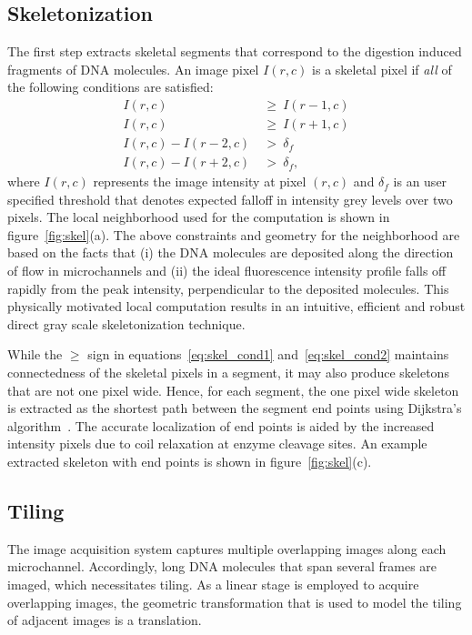 \documentclass{bmcart}
\begin{document}
\subsection*{Skeletonization}
The first step extracts skeletal segments that correspond to the digestion 
induced fragments of DNA molecules. An image pixel $I(r, c)$ is a 
skeletal pixel if \emph{all} of the following conditions are satisfied:
\begin{align}
I(r, c)~&\geq~I(r - 1, c) \label{eq:skel_cond1}\\
I(r, c)~&\geq~I(r + 1, c) \label{eq:skel_cond2}\\
I(r, c) - I(r - 2, c)~&>~\delta_f \label{eq:skel_cond3}\\ 
I(r, c) - I(r + 2, c)~&>~\delta_f \label{eq:skel_cond4},
\end{align}
where $I(r, c)$ represents the image intensity at pixel $(r, c)$ and $\delta_f$ 
is an user specified threshold that denotes expected falloff 
in intensity grey levels over two pixels. The local neighborhood used for the 
computation is shown in figure~\ref{fig:skel}(a). The above constraints and 
geometry for the neighborhood are based on the facts that (i) the DNA molecules 
are deposited along the direction of flow in microchannels and (ii) the ideal fluorescence intensity profile falls off rapidly from the peak intensity, 
perpendicular to the deposited molecules. This physically motivated local 
computation results in an intuitive, efficient and robust direct gray scale skeletonization technique.   

While the $\geq$ sign in equations~\ref{eq:skel_cond1} 
and~\ref{eq:skel_cond2} maintains connectedness of the skeletal pixels in a 
segment, it may also produce skeletons that are not one pixel wide. Hence, for 
each segment, the one pixel wide skeleton is extracted as the shortest path 
between the segment end points using Dijkstra's algorithm~\cite{Cormen2009}. 
The accurate localization of end points is aided by the increased intensity 
pixels due to coil relaxation at enzyme cleavage sites. An example extracted 
skeleton with end points is shown in figure~\ref{fig:skel}(c).  

\subsection*{Tiling}
The image acquisition system captures multiple overlapping images along each 
microchannel. Accordingly, long DNA molecules that span several frames are 
imaged, which necessitates tiling. As a linear stage is employed to acquire 
overlapping images, the geometric transformation that is used to model 
the tiling of adjacent images is a translation. 
 
\end{document}
